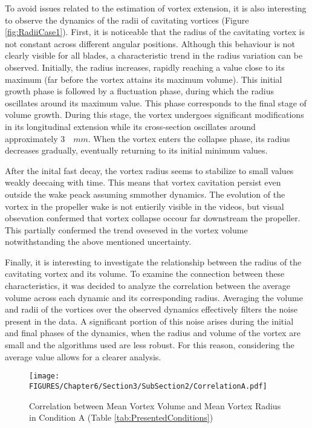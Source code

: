 \begin{itemize}
    To avoid issues related to the estimation of vortex extension, it is also interesting to observe the dynamics of the radii of cavitating vortices (Figure \ref{fig:RadiiCase1}).  
    First, it is noticeable that the radius of the cavitating vortex is not constant across different angular positions. Although this behaviour is not clearly visible for all blades, a characteristic trend in the radius variation can be observed.  
    Initially, the radius increases, rapidly reaching a value close to its maximum (far before the vortex attains its maximum volume).  
    This initial growth phase is followed by a fluctuation phase, during which the radius oscillates around its maximum value. This phase corresponds to the final stage of volume growth.  
    During this stage, the vortex undergoes significant modifications in its longitudinal extension while its cross-section oscillates around approximately $3 \quad mm$.  
    When the vortex enters the collapse phase, its radius decreases gradually, eventually returning to its initial minimum values.  

    After the inital fast decay, the vortex radius seems to stabilize to small values weakly deecaing with time. This means that vortex cavitation persist even outside the wake peack assuming smmother dynamics.
    The evolution of the vortex in the propeller wake is not entierily visible in the videos, but visual obsevation confermed that vortex collapse occour far downstream the propeller.
    This partially confermed the trend oveseved in the vortex volume notwithstanding the above mentioned uncertainty.

    Finally, it is interesting to investigate the relationship between the radius of the cavitating vortex and its volume. To examine the connection between these characteristics, it was decided to analyze the correlation between the average volume across each dynamic and its corresponding radius. 
    Averaging the volume and radii of the vortices over the observed dynamics effectively filters the noise present in the data. A significant portion of this noise arises during the initial and final phases of the dynamics, when the radius and volume of the vortex are small and the algorithms used are less robust. For this reason, considering the average value allows for a clearer analysis.
    
    \begin{figure}[h] 
        \centering
        \texttt{[image: FIGURES/Chapter6/Section3/SubSection2/CorrelationA.pdf]}
        \caption{Correlation between Mean Vortex Volume and Mean Vortex Radius in Condition A (Table \ref{tab:PresentedConditions})}
        \label{fig:CorrelationA}
    \end{figure}


\end{itemize}
